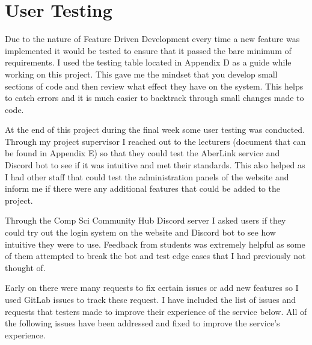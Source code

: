 \section{User Testing}\label{sec4:user-tesing}
Due to the nature of Feature Driven Development every time a new feature was implemented it would be tested to ensure that it passed the bare minimum of requirements. I used the testing table located in Appendix D as a guide while working on this project. This gave me the mindset that you develop small sections of code and then review what effect they have on the system. This helps to catch errors and it is much easier to backtrack through small changes made to code.

At the end of this project during the final week some user testing was conducted. Through my project supervisor I reached out to the lecturers (document that can be found in Appendix E) so that they could test the AberLink service and Discord bot to see if it was intuitive and met their standards. This also helped as I had other staff that could test the administration panels of the website and inform me if there were any additional features that could be added to the project.

Through the Comp Sci Community Hub Discord server I asked users if they could try out the login system on the website and Discord bot to see how intuitive they were to use. Feedback from students was extremely helpful as some of them attempted to break the bot and test edge cases that I had previously not thought of. 

Early on there were many requests to fix certain issues or add new features so I used GitLab issues to track these request. I have included the list of issues and requests that testers made to improve their experience of the service below. All of the following issues have been addressed and fixed to improve the service's experience.

